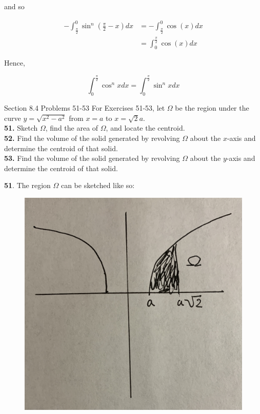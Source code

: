 \documentclass{article}
\begin{document}
    and so

    \begin{align*}
        -\int^0_{\frac{\pi}{2}}\sin^n{\left(\frac{\pi}{2}-x\right)}dx   &= -\int_{\frac{\pi}{2}}^0 \cos{(x)}dx \\
                                                                        &= \int_0^{\frac{\pi}{2}} \cos{(x)}dx
    \end{align*}

    Hence,

    \[
        \int_0^{\frac{\pi}{2}} \cos^n{x}dx = \int_0^{\frac{\pi}{2}}\sin^n{x}dx
    \]

    \pagebreak

    \begin{tbhtheorem}{Section 8.4 Problems 51-53}
        For Exercises 51-53, let $\Omega$ be the region under the curve $y=\sqrt{x^2-a^2}$ from $x=a$ to $x=\sqrt{2}a$. \\
        \textbf{51.} Sketch $\Omega$, find the area of $\Omega$, and locate the centroid. \\
        \textbf{52.} Find the volume of the solid generated by revolving $\Omega$ about the $x$-axis and determine the centroid of that solid. \\
        \textbf{53.} Find the volume of the solid generated by revolving $\Omega$ about the $y$-axis and determine the centroid of that solid.
    \end{tbhtheorem}

    \textbf{51}. The region $\Omega$ can be sketched like so:
    
    \begin{figure}[hbt!]
        \centering
        \includegraphics[scale=0.1]{omega3}
    \end{figure}
\end{document}
